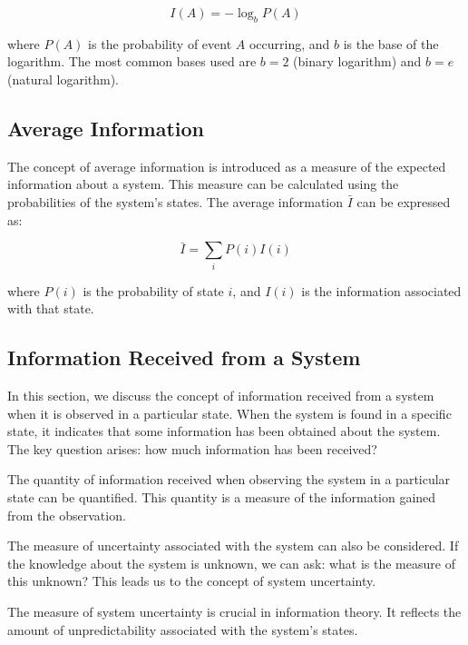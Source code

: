 \documentclass[12pt,a4paper]{article}
\newenvironment{defbox}[1][]{%
  \begin{tcolorbox}[enhanced, breakable, colback=defcolor, colframe=green!50!black, title=#1, fonttitle=\bfseries, arc=3pt, boxrule=0.5pt]
}{\end{tcolorbox}}
\newenvironment{rembox}[1][]{%
  \begin{tcolorbox}[enhanced, breakable, colback=gray!5, colframe=gray!50, title=#1, fonttitle=\bfseries, arc=3pt, boxrule=0.5pt]
}{\end{tcolorbox}}
\begin{document}
\begin{equation}
I(A) = -\log_b P(A)
\end{equation}

where \( P(A) \) is the probability of event \( A \) occurring, and \( b \) is the base of the logarithm. The most common bases used are \( b = 2 \) (binary logarithm) and \( b = e \) (natural logarithm).

\subsection{Average Information}
The concept of average information is introduced as a measure of the expected information about a system. This measure can be calculated using the probabilities of the system's states. The average information \( \bar{I} \) can be expressed as:

\begin{equation}
\bar{I} = \sum_{i} P(i) I(i)
\end{equation}

where \( P(i) \) is the probability of state \( i \), and \( I(i) \) is the information associated with that state.

\subsection{Information Received from a System}
In this section, we discuss the concept of information received from a system when it is observed in a particular state. When the system is found in a specific state, it indicates that some information has been obtained about the system. The key question arises: how much information has been received?

\begin{defbox}[Quantity of Information]
The quantity of information received when observing the system in a particular state can be quantified. This quantity is a measure of the information gained from the observation.
\end{defbox}

The measure of uncertainty associated with the system can also be considered. If the knowledge about the system is unknown, we can ask: what is the measure of this unknown? This leads us to the concept of system uncertainty.

\begin{rembox}[System Uncertainty]
The measure of system uncertainty is crucial in information theory. It reflects the amount of unpredictability associated with the system's states.
\end{rembox}
\end{document}
